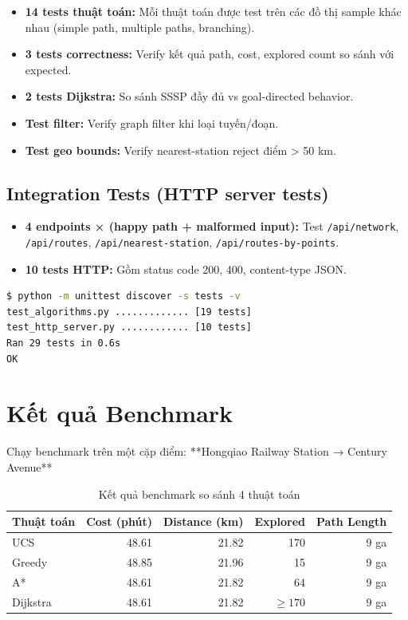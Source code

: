 \begin{itemize}
  \item \textbf{14 tests thuật toán:} Mỗi thuật toán được test trên các đồ thị sample khác nhau (simple path, multiple paths, branching).
  \item \textbf{3 tests correctness:} Verify kết quả path, cost, explored count so sánh với expected.
  \item \textbf{2 tests Dijkstra:} So sánh SSSP đầy đủ vs goal-directed behavior.
  \item \textbf{Test filter:} Verify graph filter khi loại tuyến/đoạn.
  \item \textbf{Test geo bounds:} Verify nearest-station reject điểm > 50 km.
\end{itemize}

\subsection{Integration Tests (HTTP server tests)}

\begin{itemize}
  \item \textbf{4 endpoints × (happy path + malformed input):} Test \texttt{/api/network}, \texttt{/api/routes}, \texttt{/api/nearest-station}, \texttt{/api/routes-by-points}.
  \item \textbf{10 tests HTTP:} Gồm status code 200, 400, content-type JSON.
\end{itemize}

\begin{lstlisting}[language=bash, caption=Chạy kiểm thử]
$ python -m unittest discover -s tests -v
test_algorithms.py ............. [19 tests]
test_http_server.py ............ [10 tests]
Ran 29 tests in 0.6s
OK
\end{lstlisting}

\section{Kết quả Benchmark}

Chạy benchmark trên một cặp điểm: **Hongqiao Railway Station → Century Avenue**

\begin{table}[H]
  \centering
  \caption{Kết quả benchmark so sánh 4 thuật toán}
  \label{tab:benchmark}
  \begin{tabular}{lrrrr}
    \toprule
    \textbf{Thuật toán} & \textbf{Cost (phút)} & \textbf{Distance (km)} & \textbf{Explored} & \textbf{Path Length} \\
    \midrule
    UCS & 48.61 & 21.82 & 170 & 9 ga \\
    Greedy & 48.85 & 21.96 & 15 & 9 ga \\
    A* & 48.61 & 21.82 & 64 & 9 ga \\
    Dijkstra & 48.61 & 21.82 & $\geq 170$ & 9 ga \\
    \bottomrule
  \end{tabular}
\end{table}

